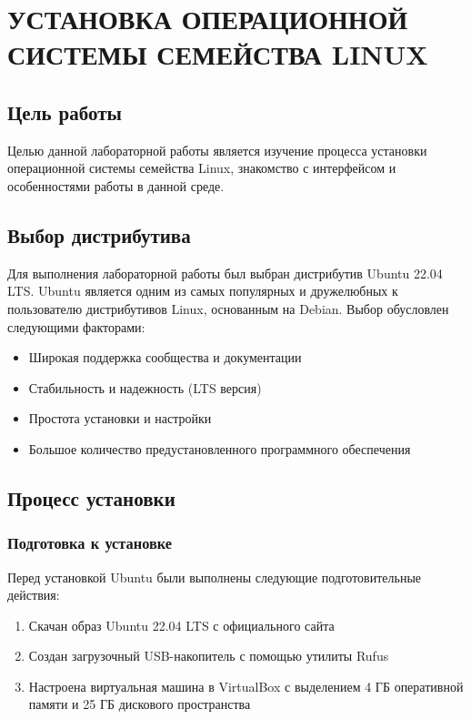 \chapter{УСТАНОВКА ОПЕРАЦИОННОЙ СИСТЕМЫ СЕМЕЙСТВА LINUX}

\section{Цель работы}

Целью данной лабораторной работы является изучение процесса установки операционной системы семейства Linux, знакомство с интерфейсом и особенностями работы в данной среде.

\section{Выбор дистрибутива}

Для выполнения лабораторной работы был выбран дистрибутив Ubuntu 22.04 LTS. Ubuntu является одним из самых популярных и дружелюбных к пользователю дистрибутивов Linux, основанным на Debian. Выбор обусловлен следующими факторами:

\begin{itemize}
    \item Широкая поддержка сообщества и документации
    \item Стабильность и надежность (LTS версия)
    \item Простота установки и настройки
    \item Большое количество предустановленного программного обеспечения
\end{itemize}

\section{Процесс установки}

\subsection{Подготовка к установке}

Перед установкой Ubuntu были выполнены следующие подготовительные действия:

\begin{enumerate}
    \item Скачан образ Ubuntu 22.04 LTS с официального сайта
    \item Создан загрузочный USB-накопитель с помощью утилиты Rufus
    \item Настроена виртуальная машина в VirtualBox с выделением 4 ГБ оперативной памяти и 25 ГБ дискового пространства
\end{enumerate}

